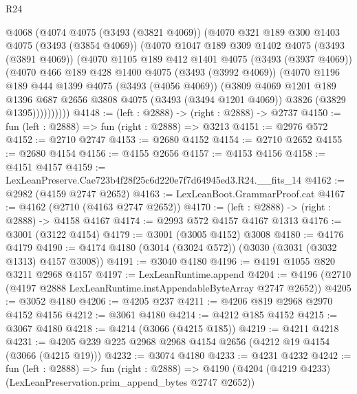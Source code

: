 \begin{lexlean}{R24}
\begin{coremodule}
      @4068
        (@4074
          @4075
          (@3493 (@3821 @4069))
          (@4070
            @321
            @189
            @300
            @1403
            @4075
            (@3493 (@3854 @4069))
            (@4070
              @1047
              @189
              @309
              @1402
              @4075
              (@3493 (@3891 @4069))
              (@4070
                @1105
                @189
                @412
                @1401
                @4075
                (@3493 (@3937 @4069))
                (@4070
                  @466
                  @189
                  @428
                  @1400
                  @4075
                  (@3493 (@3992 @4069))
                  (@4070
                    @1196
                    @189
                    @444
                    @1399
                    @4075
                    (@3493 (@4056 @4069))
                    (@3809
                      @4069
                      @1201
                      @189
                      @1396
                      @687
                      @2656
                      @3808
                      @4075
                      (@3493 (@3494 @1201 @4069))
                      @3826
                      (@3829 @1395))))))))))
@4148 := (left : @2888) -> (right : @2888) -> @2737
@4150 := fun (left : @2888) => fun (right : @2888) => @3213
@4151 := @2976 @572
@4152 := @2710 @2747
@4153 := @2680 @4152
@4154 := @2710 @2652
@4155 := @2680 @4154
@4156 := @4155 @2656
@4157 := @4153 @4156
@4158 := @4151 @4157
@4159 := LexLeanPreserve.Cae723b4f28f25c6d220e7f7d64945ed3.R24.__fits_14
@4162 := @2982 (@4159 @2747 @2652)
@4163 := LexLeanBoot.GrammarProof.cat
@4167 := @4162 (@2710 (@4163 @2747 @2652))
@4170 := (left : @2888) -> (right : @2888) -> @4158 @4167
@4174 := @2993 @572 @4157 @4167 @1313
@4176 := @3001 (@3122 @4154)
@4179 := @3001 (@3005 @4152) @3008
@4180 := @4176 @4179
@4190 := @4174 @4180 (@3014 (@3024 @572)) (@3030 (@3031 (@3032 @1313) @4157 @3008))
@4191 := @3040 @4180
@4196 := @4191 @1055 @820 @3211 @2968 @4157
@4197 := LexLeanRuntime.append
@4204 := @4196 (@2710 (@4197 @2888 LexLeanRuntime.instAppendableByteArray @2747 @2652))
@4205 := @3052 @4180
@4206 := @4205 @237
@4211 := @4206 @819 @2968 @2970 @4152 @4156
@4212 := @3061 @4180
@4214 := @4212 @185 @4152
@4215 := @3067 @4180
@4218 := @4214 (@3066 (@4215 @185))
@4219 := @4211 @4218
@4231 := @4205 @239 @225 @2968 @2968 @4154 @2656 (@4212 @19 @4154 (@3066 (@4215 @19)))
@4232 := @3074 @4180
@4233 := @4231 @4232
@4242 := fun (left : @2888) =>
  fun (right : @2888) =>
  @4190 (@4204 (@4219 @4233) (LexLeanPreservation.prim_append_bytes @2747 @2652))

\end{coremodule}
\end{lexlean}
